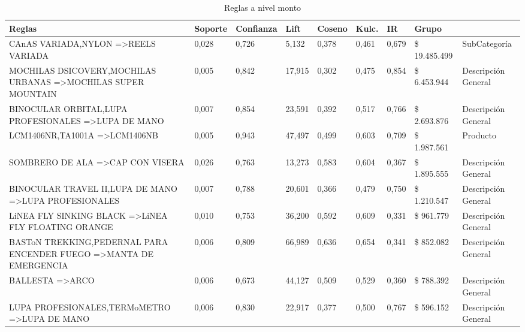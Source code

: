 \documentclass[]{article}
\begin{document}
	
	\begin{landscape}
		
		\begin{table}[]
			\centering
			\caption{Reglas a nivel monto}
			\label{Tab_Reg_Monto}%
			\begin{tabular}{lllllllll}
				{\bf Reglas}                                                                         & {\bf Soporte} & {\bf Confianza} & {\bf Lift} & {\bf Coseno} & {\bf Kulc.} & {\bf IR} & {\bf Grupo}\\
				\hline
				CAnAS VARIADA,NYLON =\textgreater REELS VARIADA                                & 0,028   & 0,726 & 5,132  & 0,378  & 0,461  & 0,679 & \$ 19.485.499 & SubCategoría        \\
				MOCHILAS DSICOVERY,MOCHILAS URBANAS =\textgreater MOCHILAS SUPER MOUNTAIN      & 0,005   & 0,842 & 17,915 & 0,302  & 0,475  & 0,854 & \$ 6.453.944  & Descripción General \\
				BINOCULAR ORBITAL,LUPA PROFESIONALES =\textgreater LUPA DE MANO                & 0,007   & 0,854 & 23,591 & 0,392  & 0,517  & 0,766 & \$ 2.693.876  & Descripción General \\
				LCM1406NR,TA1001A =\textgreater LCM1406NB                                      & 0,005   & 0,943 & 47,497 & 0,499  & 0,603  & 0,709 & \$ 1.987.561  & Producto            \\
				SOMBRERO DE ALA =\textgreater CAP CON VISERA                                   & 0,026   & 0,763 & 13,273 & 0,583  & 0,604  & 0,367 & \$ 1.895.555  & Descripción General \\
				BINOCULAR TRAVEL II,LUPA DE MANO =\textgreater LUPA PROFESIONALES              & 0,007   & 0,788 & 20,601 & 0,366  & 0,479  & 0,750 & \$ 1.210.547  & Descripción General \\
				LiNEA FLY SINKING BLACK =\textgreater LiNEA FLY FLOATING ORANGE                & 0,010   & 0,753 & 36,200 & 0,592  & 0,609  & 0,331 & \$ 961.779    & Descripción General \\
				BASToN TREKKING,PEDERNAL PARA ENCENDER FUEGO =\textgreater MANTA DE EMERGENCIA & 0,006   & 0,809 & 66,989 & 0,636  & 0,654  & 0,341 & \$ 852.082    & Descripción General \\
				BALLESTA =\textgreater ARCO                                                    & 0,006   & 0,673 & 44,127 & 0,509  & 0,529  & 0,360 & \$ 788.392    & Descripción General \\
				LUPA PROFESIONALES,TERMoMETRO =\textgreater LUPA DE MANO                       & 0,006   & 0,830 & 22,917 & 0,377  & 0,500  & 0,767 & \$ 596.152    & Descripción General
			\end{tabular}
		\end{table}	
	\end{landscape}
	\restoregeometry
	
\end{document}
